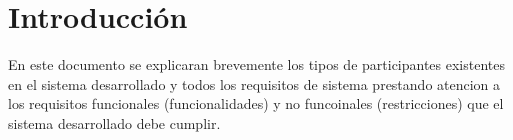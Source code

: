 \chapter{Introducción}

    En este documento se explicaran brevemente los tipos de participantes existentes en el sistema desarrollado y todos los requisitos de sistema prestando atencion a los requisitos funcionales (funcionalidades) y no funcoinales (restricciones) que el sistema desarrollado debe cumplir.
